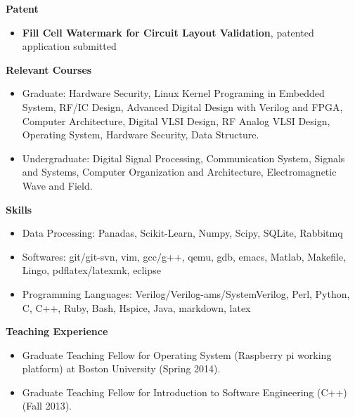 \documentclass[]{article}
\begin{document}
\noindent \textbf{Patent}
\begin{itemize}
    \item \textbf{Fill Cell Watermark for Circuit Layout Validation}, patented application submitted
\end{itemize}

\noindent \textbf{Relevant Courses}
\begin{itemize}
\item Graduate:
                    Hardware Security, Linux Kernel Programing in Embedded System, RF/IC Design,
                    Advanced Digital Design with Verilog and FPGA, Computer
                    Architecture, Digital VLSI Design, RF Analog VLSI Design,
                    Operating System, Hardware Security, Data Structure.
\item Undergraduate:
                    Digital Signal Processing, Communication System, Signals
                    and Systems, Computer Organization and 
                    Architecture, Electromagnetic Wave and Field. 
\end{itemize}


\noindent \textbf{Skills}
\begin{itemize}
\item Data Processing: Panadas, Scikit-Learn, Numpy, Scipy, SQLite, Rabbitmq
\item Softwares: git/git-svn, vim, gcc/g++, qemu, gdb, emacs, Matlab, Makefile, Lingo,
pdflatex/latexmk, eclipse
\item Programming Languages:  Verilog/Verilog-ams/SystemVerilog, Perl, Python, C, C++, Ruby, Bash,
Hspice, Java, markdown, latex
% 
\end{itemize}
\noindent \textbf{Teaching Experience}
\begin{itemize}
\item Graduate Teaching Fellow for Operating System (Raspberry pi working
platform) at Boston University (Spring 2014).
\item Graduate Teaching Fellow for Introduction to Software Engineering (C++)
(Fall 2013).
\end{itemize}
\end{document}
